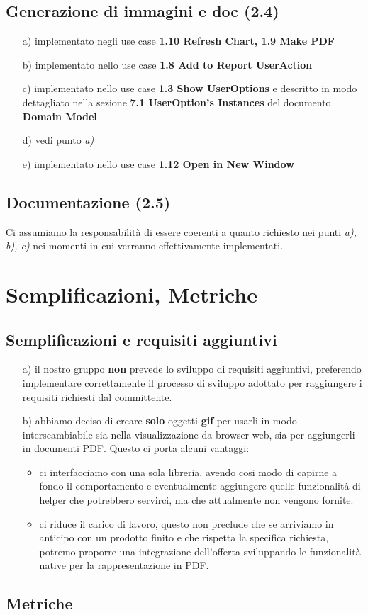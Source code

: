 \documentclass[a4paper, 12pt]{report}
\begin{document}
\section{Generazione di immagini e doc (2.4)}
\begin{itemize}
  \item[a)] implementato negli use case \textbf{1.10 Refresh Chart, 1.9 Make
  PDF}
  \item[b)] implementato nello use case \textbf{1.8 Add to Report UserAction}
  \item[c)] implementato nello use case \textbf{1.3 Show UserOptions} e
  descritto in modo dettagliato nella sezione \textbf{7.1 UserOption’s
  Instances} del documento \textbf{Domain Model}
  \item[d)] vedi punto \emph{a)}
  \item[e)] implementato nello use case \textbf{1.12 Open in New Window}
\end{itemize}

\section{Documentazione (2.5)}
Ci assumiamo la responsabilit\`a di essere coerenti a quanto richiesto nei
punti \emph{a), b), c)} nei momenti in cui verranno effettivamente implementati.

\chapter{Semplificazioni, Metriche}
\section{Semplificazioni e requisiti aggiuntivi}
\begin{itemize}
  \item[a)] il nostro gruppo \textbf{non} prevede lo sviluppo di requisiti
  aggiuntivi, preferendo implementare correttamente il processo di sviluppo adottato per
  raggiungere i requisiti richiesti dal committente.
  \item[b)] abbiamo deciso di creare \textbf{solo} oggetti \textbf{gif} per
  usarli in modo interscambiabile sia nella visualizzazione da browser web, sia
  per aggiungerli in documenti PDF. Questo ci porta alcuni vantaggi:
  \begin{itemize}
    \item ci interfacciamo con una sola libreria, avendo cosi modo di capirne a
    fondo il comportamento e eventualmente aggiungere quelle funzionalit\`a di
    helper che potrebbero servirci, ma che attualmente non vengono fornite.
    \item ci riduce il carico di lavoro, questo non preclude che se arriviamo
    in anticipo con un prodotto finito e che rispetta la specifica richiesta,
    potremo proporre una integrazione dell'offerta sviluppando le
    funzionalit\`a native per la rappresentazione in PDF.
    \end{itemize}
\end{itemize}

\section{Metriche}
\end{document}
